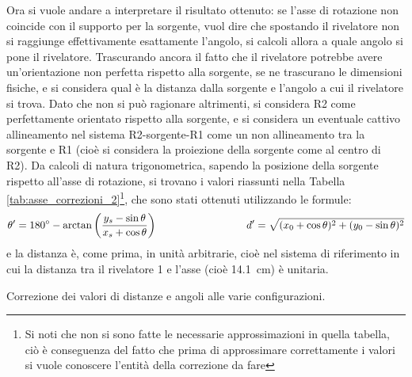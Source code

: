 Ora si vuole andare a interpretare il risultato ottenuto: se l'asse di rotazione non coincide con il supporto per la sorgente, vuol dire che spostando il rivelatore non
si raggiunge effettivamente esattamente l'angolo, si calcoli allora a quale angolo si pone il rivelatore. Trascurando ancora il fatto che il rivelatore potrebbe avere
un'orientazione non perfetta rispetto alla sorgente, se ne trascurano le dimensioni fisiche, e si considera qual è la distanza dalla sorgente e l'angolo a cui il rivelatore
si trova. Dato che non si può ragionare altrimenti, si considera R2 come perfettamente orientato rispetto alla sorgente, e si considera un eventuale cattivo allineamento
nel sistema R2-sorgente-R1 come un non allineamento tra la sorgente e R1 (cioè si considera la proiezione della sorgente come al centro di R2). Da calcoli di natura
trigonometrica, sapendo la posizione della sorgente rispetto all'asse di rotazione, si trovano i valori riassunti nella Tabella \ref{tab:asse_correzioni_2}\footnote{Si noti
che non si sono fatte le necessarie approssimazioni in quella tabella, ciò è conseguenza del fatto che prima di approssimare correttamente i valori si vuole conoscere 
l'entità della correzione da fare}, che sono stati ottenuti utilizzando le formule:
$$\theta' = 180^\circ -\arctan\left(\frac{y_s-\sin\theta}{x_s+\cos\theta}\right) \hspace{3 cm} d' = \sqrt{(x_0+\cos\theta)^2+(y_0-\sin\theta)^2}$$
e la distanza è, come prima, in unità arbitrarie, cioè nel sistema di riferimento in cui la distanza tra il rivelatore 1 e l'asse (cioè 14.1~cm) è unitaria.
%
\begin{table}[h]
	\centering
	
	\caption{Correzione dei valori di distanze e angoli alle varie configurazioni.}
	\label{tab:asse_correzioni_2}
\end{table}
%
